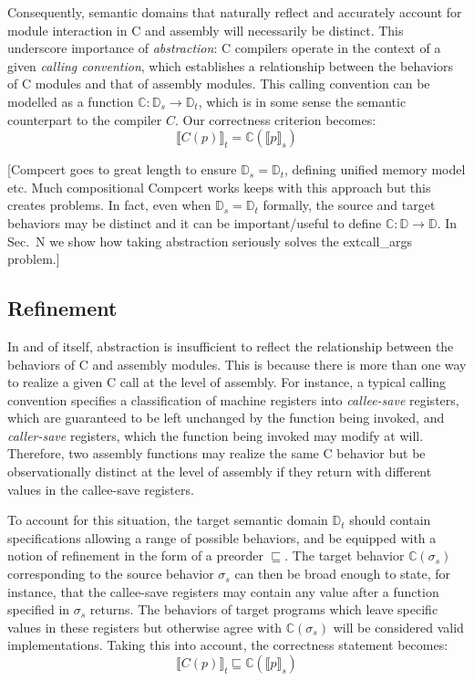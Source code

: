 \documentclass[sigplan,10pt,review,anonymous]{acmart}
\begin{document}
Consequently,
semantic domains that naturally reflect and accurately account
for module interaction in C and assembly will necessarily be distinct.
This underscore importance of \emph{abstraction}:
C compilers operate in the context of a given \emph{calling convention},
which establishes a relationship between the behaviors of C modules
and that of assembly modules.
This calling convention can be modelled as a function
$\mathbb{C} : \mathbb{D}_s \rightarrow \mathbb{D}_t$,
which is in some sense the semantic counterpart to the compiler $C$.
Our correctness criterion becomes:
\[ \llbracket C(p) \rrbracket_t =
    \mathbb{C}(\llbracket p \rrbracket_s) \]

[Compcert goes to great length to ensure $\mathbb{D}_s = \mathbb{D}_t$,
defining unified memory model etc.
Much compositional Compcert works keeps with this approach
but this creates problems.
In fact, even when $\mathbb{D}_s = \mathbb{D}_t$ formally,
the source and target behaviors may be distinct
and it can be important/useful to define
$\mathbb{C} : \mathbb{D} \rightarrow \mathbb{D}$.
In Sec.~N we show how taking abstraction seriously
solves the extcall\_args problem.]


\subsection{Refinement} %

In and of itself,
abstraction is insufficient to reflect
the relationship between the behaviors of C and assembly modules.
This is because there is more than one way to realize
a given C call at the level of assembly.
For instance,
a typical calling convention specifies a classification of machine registers
into \emph{callee-save} registers,
which are guaranteed to be left unchanged by the function being invoked,
and \emph{caller-save} registers,
which the function being invoked may modify at will.
Therefore,
two assembly functions may realize the same C behavior
but be observationally distinct at the level of assembly
if they return with different values in the callee-save registers.

To account for this situation,
the target semantic domain $\mathbb{D}_t$
should contain specifications
allowing a range of possible behaviors,
and be equipped with a notion of refinement
in the form of a preorder $\sqsubseteq$.
The target behavior $\mathbb{C}(\sigma_s)$
corresponding to the source behavior $\sigma_s$
can then be broad enough to state,
for instance,
that the callee-save registers
may contain any value after a function
specified in $\sigma_s$ returns.
The behaviors of target programs
which leave specific values in these registers
but otherwise agree with $\mathbb{C}(\sigma_s)$
will be considered valid implementations.
Taking this into account,
the correctness statement becomes:
\[ \llbracket C(p) \rrbracket_t \sqsubseteq
    \mathbb{C}(\llbracket p \rrbracket_s) \]
\end{document}
